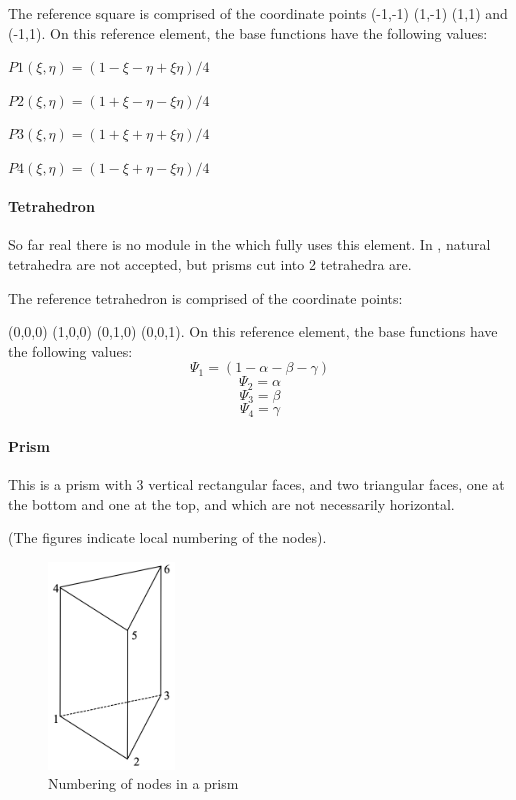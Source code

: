 The reference square is comprised of the coordinate points (-1,-1)  (1,-1)  (1,1) and (-1,1). On this reference element, the base functions have the following values:

$P1(\xi,\eta) = ( 1 - \xi- \eta + \xi\eta)/4$

$P2(\xi,\eta) = ( 1 + \xi- \eta - \xi\eta)/4$

$P3(\xi,\eta) = ( 1 + \xi+ \eta + \xi\eta)/4$

$P4(\xi,\eta) = ( 1 - \xi+ \eta - \xi\eta)/4$

\paragraph{Tetrahedron}

So far real there is no module in the \telemacsystem which fully uses this
element.
In , natural tetrahedra are not accepted,
but prisms cut into 2 tetrahedra are.

The reference tetrahedron is comprised of the coordinate points:

(0,0,0)  (1,0,0)  (0,1,0)  (0,0,1). On this reference element, the base
functions have the following values:
\[\Psi _{1} =(1-\alpha -\beta -\gamma )\]
\[\Psi _{2} =\alpha \]
\[\Psi _{3} =\beta \]
\[\Psi _{4} =\gamma \]

\paragraph{Prism}

This is a prism with 3 vertical rectangular faces, and two triangular faces,
one at the bottom and one at the top, and which are not necessarily horizontal.

    (The figures indicate local numbering of the nodes).
\begin{figure}[H]%
\begin{center}
%
  \includegraphics[width=0.3\textwidth]{./graphics/prism-numbering}
%
\end{center}
\caption{Numbering of nodes in a prism}
\label{fig:prismnumbering}
\end{figure}


